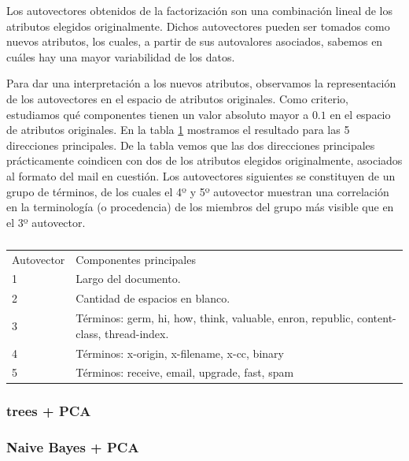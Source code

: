 \documentclass[a4paper,10pt]{article}
\begin{document}
\par Los autovectores obtenidos de la factorización son una combinación lineal de los atributos elegidos originalmente. Dichos autovectores pueden ser tomados como nuevos atributos, los cuales, a partir de sus autovalores asociados, sabemos en cuáles hay una mayor variabilidad de los datos. 
\par Para dar una interpretación a los nuevos atributos, observamos la representación de los autovectores en el espacio de atributos originales. Como criterio, estudiamos qué componentes tienen un valor absoluto mayor a $0.1$ en el espacio de atributos originales. En la tabla \ref{table:autovectores} mostramos el resultado para las 5 direcciones principales. De la tabla vemos que las dos direcciones principales prácticamente coindicen con dos de los atributos elegidos originalmente, asociados al formato del mail en cuestión. Los autovectores siguientes se constituyen de un grupo de términos, de los cuales el 4º y 5º autovector muestran una correlación en la terminología (o procedencia) de los miembros del grupo más visible que en el 3º autovector. 
\begin{table}
\centering
\caption{}
\label{table:autovectores}
\begin{tabular}{ll}
Autovector & Componentes principales \\
1 & Largo del documento. \\
2 & Cantidad de espacios en blanco. \\
3 & Términos: germ, hi, how, think, valuable, enron, republic, content-class, thread-index. \\
4 & Términos: x-origin, x-filename, x-cc, binary \\
5 & Términos: receive, email, upgrade, fast, spam \\
\end{tabular}
\end{table}


\subsubsection{trees + PCA}



\subsubsection{Naive Bayes + PCA}\label{sec:NB_PCA}
\end{document}
